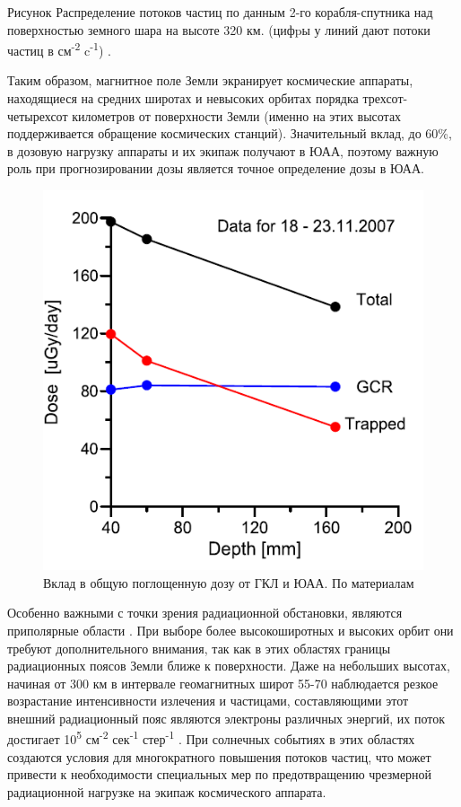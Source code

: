 

Рисунок Распределение потоков частиц по данным 2-го корабля-спутника над поверхностью земного шара на высоте 320 км. (цифpы у линий дают потоки частиц в см\textsuperscript{-2} c\textsuperscript{-1}) \cite{logachev2007}.


Таким образом, магнитное поле Земли экранирует космические аппараты, находящиеся на средних широтах и невысоких орбитах порядка трехсот-четырехсот километров от поверхности Земли (именно на этих высотах поддерживается обращение космических станций). Значительный вклад, до 60\%,  в дозовую нагрузку аппараты и их экипаж получают в ЮАА, поэтому важную роль  при прогнозировании дозы является точное определение дозы в ЮАА\cite{lish2014, Lishnevskii2012}.

\begin{figure}
	\centering
	\includegraphics[width=0.7\linewidth]{images/liulinGCRSAA}
	\caption{Вклад в общую поглощенную дозу от ГКЛ и ЮАА. По материалам  \cite{Dachev2015}}
	\label{fig:liulingcrsaa}
\end{figure}

Особенно важными с точки зрения радиационной обстановки, являются приполярные области \cite{gorchakov1961}. При выборе более высокоширотных и высоких орбит они требуют дополнительного внимания, так как в этих областях границы радиационных поясов Земли ближе к поверхности. Даже на небольших высотах, начиная от 300 км в интервале геомагнитных широт 55-70 наблюдается резкое возрастание интенсивности излечения и частицами, составляющими этот внешний радиационный пояс являются электроны различных энергий, их поток достигает 10\textsuperscript{5} см\textsuperscript{-2} сек\textsuperscript{-1} стер\textsuperscript{-1} \cite{vernov1960}. При солнечных событиях в этих областях создаются условия для многократного повышения потоков частиц, что может привести к необходимости специальных мер по предотвращению чрезмерной радиационной нагрузке на экипаж космического аппарата.

